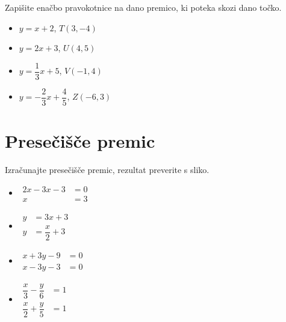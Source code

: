         
            \begin{naloga}
                Zapišite enačbo pravokotnice na dano premico, ki poteka skozi dano točko.
                    \begin{itemize}
                        \item $y=x+2$, $T(3,-4)$ 
                        \item $y=2x+3$, $U(4,5)$ 
                        \item $y=\dfrac{1}{3}x+5$, $V(-1,4)$ 
                        \item $y=-\dfrac{2}{3}x+\dfrac{4}{5}$, $Z(-6,3)$ 

                    \end{itemize}
            \end{naloga}

        





\newpage
    \section{Presečišče premic}




            
            \begin{naloga}
                Izračunajte presečišče premic, rezultat preverite s sliko.
                \begin{multicols}{2}   
                \begin{itemize}
                        \item $\begin{aligned}
                            2x-3x-3&=0 \\ x&=3
                        \end{aligned}$ 
                        \item $\begin{aligned}
                            y&=3x+3 \\ y&=\dfrac{x}{2}+3
                        \end{aligned}$ 
                        \item $\begin{aligned}
                            x+3y-9&=0 \\ x-3y-3&=0
                        \end{aligned}$ 
                        \item $\begin{aligned}
                            \dfrac{x}{3}-\dfrac{y}{6}&=1 \\ \dfrac{x}{2}+\dfrac{y}{5}&=1
                        \end{aligned}$ 

                \end{itemize}
            \end{multicols}
            \end{naloga}
        


